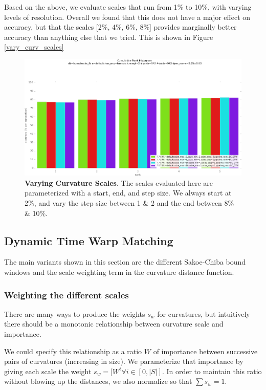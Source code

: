 Based on the above, we evaluate scales that run from 1\% to 10\%, with varying levels of resolution.
Overall we found that this does not have a major effect on accuracy, but that the scales [2\%, 4\%, 6\%, 8\%] provides marginally better accuracy than anything else that we tried.
This is shown in Figure \ref{vary_curv_scales}

\begin{figure}[t]%
\centering
\includegraphics[width=1\textwidth]{../images/results/vary_curv_scales.png}
\caption[]{\textbf{Varying Curvature Scales}. The scales evaluated here are parameterized with a start, end, and step size. We always start at 2\%, and vary the step size between 1 \& 2 and the end between 8\% \& 10\%.}
\label{fig:vary_curv_scales}
\end{figure}

\subsection{Dynamic Time Warp Matching}

The main variants shown in this section are the different Sakoe-Chiba bound windows and the scale weighting term in the curvature distance function.

\subsubsection{Weighting the different scales}

There are many ways to produce the weights $s_w$ for curvatures, but intuitively there should be a monotonic relationship between curvature scale and importance.

We could specify this relationship as a ratio $W$ of importance between successive pairs of curvatures (increasing in size).
We parameterize that importance by giving each scale the weight $s_w = [W^i \forall i \in [0,|S|]$.
In order to maintain this ratio without blowing up the distances, we also normalize so that $\sum s_w = 1$.

